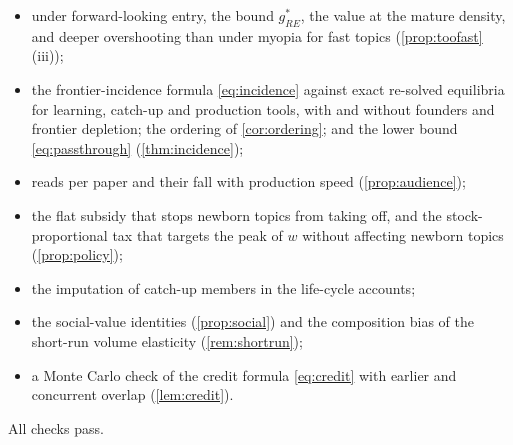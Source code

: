 \begin{itemize}
\item under forward-looking entry, the bound $g^*_{RE}$, the value at the mature density, and deeper overshooting than under myopia for fast topics (\cref{prop:toofast}(iii));
\item the frontier-incidence formula \eqref{eq:incidence} against exact re-solved equilibria for learning, catch-up and production tools, with and without founders and frontier depletion; the ordering of \cref{cor:ordering}; and the lower bound \eqref{eq:passthrough} (\cref{thm:incidence});
\item reads per paper and their fall with production speed (\cref{prop:audience});
\item the flat subsidy that stops newborn topics from taking off, and the stock-proportional tax that targets the peak of $w$ without affecting newborn topics (\cref{prop:policy});
\item the imputation of catch-up members in the life-cycle accounts;
\item the social-value identities (\cref{prop:social}) and the composition bias of the short-run volume elasticity (\cref{rem:shortrun});
\item a Monte Carlo check of the credit formula \eqref{eq:credit} with earlier and concurrent overlap (\cref{lem:credit}).
\end{itemize}
All checks pass.
